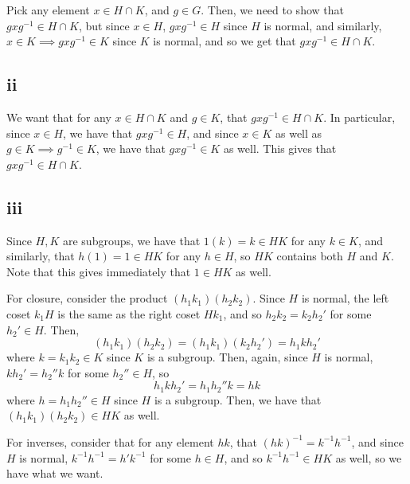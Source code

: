 \documentclass[12pt,letterpaper]{article}
\theoremstyle{definition}
\begin{document}
Pick any element $x \in H \cap K$, and $g \in G$. Then, we need to show that $gxg^{-1} \in H \cap K$, but since $x \in H$, $gxg^{-1} \in H$ since $H$ is normal, and similarly, $x \in K \implies gxg^{-1} \in K$ since $K$ is normal, and so we get that $gxg^{-1} \in H \cap K$.

\subsection*{ii}

We want that for any $x \in H \cap K$ and $g \in K$, that $gxg^{-1} \in H \cap K$. In particular, since $x \in H$, we have that $gxg^{-1} \in H$, and since $x \in K$ as well as $g \in K \implies g^{-1} \in K$, we have that $gxg^{-1} \in K$ as well. This gives that $gxg^{-1} \in H \cap K$.

\subsection*{iii}

Since $H,K$ are subgroups, we have that $1(k) = k \in HK$ for any $k \in K$, and similarly, that $h(1) = 1 \in HK$ for any $h \in H$, so $HK$ contains both $H$ and $K$. Note that this gives immediately that $1 \in HK$ as well.

For closure, consider the product $(h_{1}k_{1})(h_{2}k_{2})$. Since $H$ is normal, the left coset $k_{1}H$ is the same as the right coset $Hk_{1}$, and so $h_{2}k_{2} = k_{2}h_{2}'$ for some $h_{2}' \in H$. Then,
\[
  (h_{1}k_{1})(h_{2}k_{2}) = (h_{1}k_{1})(k_{2}h_{2}') = h_{1}kh_{2}'
\]
where $k = k_{1}k_{2} \in K$ since $K$ is a subgroup. Then, again, since $H$ is normal, $kh_{2}' = h_{2}''k$ for some $h_{2}'' \in H$, so
\[
  h_{1}kh_{2}' = h_{1}h_{2}''k = hk
\]
where $h = h_{1}h_{2}'' \in H$ since $H$ is a subgroup. Then, we have that $(h_{1}k_{1})(h_{2}k_{2}) \in HK$ as well.

For inverses, consider that for any element $hk$, that $(hk)^{-1} = k^{-1}h^{-1}$, and since $H$ is normal, $k^{-1}h^{-1} = h'k^{-1}$ for some $h \in H$, and so $k^{-1}h^{-1} \in HK$ as well, so we have what we want.
\end{document}
